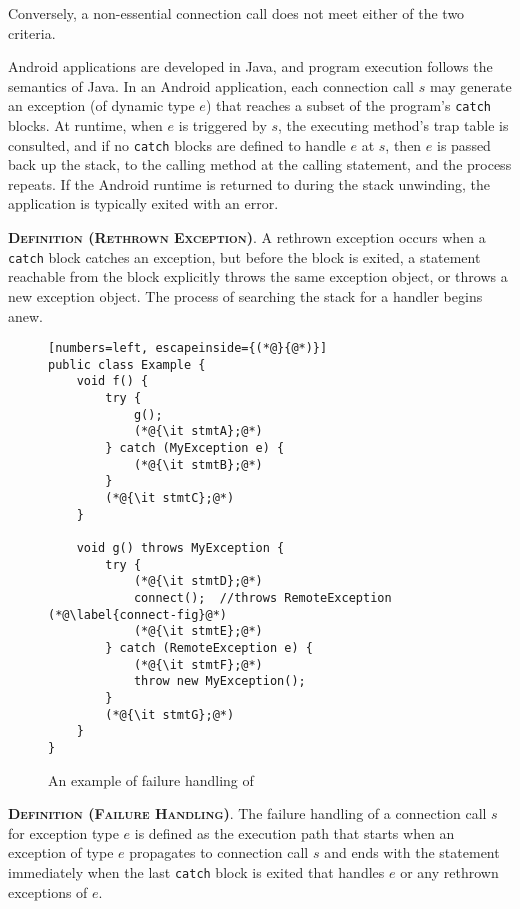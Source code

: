 \noindent Conversely, a non-essential connection call does not meet
either of the two criteria.  

Android applications are developed in Java, and program execution
follows the semantics of Java. In an Android application, each
connection call $s$ may generate an exception (of dynamic type $e$)
that reaches a subset of the program's \lstinline!catch! blocks.  At
runtime, when $e$ is triggered by $s$, the executing method's trap
table is consulted, and if no \lstinline!catch! blocks are defined to
handle $e$ at $s$, then $e$ is passed back up the stack, to the
calling method at the calling statement, and the process repeats.  If
the Android runtime is returned to during the stack unwinding, the
application is typically exited with an error.  

\noindent\textsc{\bfseries{Definition (Rethrown Exception)}}.  A
rethrown exception occurs when a \lstinline!catch! block catches an
exception, but before the block is exited, a statement reachable from
the block explicitly throws the same exception object, or throws a new
exception object.  The process of searching the stack for a handler
begins anew.

\begin{figure}
    \begin{lstlisting}[numbers=left, escapeinside={(*@}{@*)}]
public class Example {
    void f() {
        try {
            g();
            (*@{\it stmtA};@*)
        } catch (MyException e) {
            (*@{\it stmtB};@*)
        }
        (*@{\it stmtC};@*)
    }

    void g() throws MyException {
        try {
            (*@{\it stmtD};@*)
            connect();  //throws RemoteException (*@\label{connect-fig}@*)
            (*@{\it stmtE};@*)
        } catch (RemoteException e) {
            (*@{\it stmtF};@*)
            throw new MyException();            
        }        
        (*@{\it stmtG};@*)
    }
}
\end{lstlisting}
\caption{\label{fig:failure-handling}An example of failure handling of
}
\end{figure}

\noindent\textsc{\bfseries{Definition (Failure Handling)}}. The
failure handling of a connection call $s$ for exception type $e$ is
defined as the execution path that starts when an exception of type
$e$ propagates to connection call $s$ and ends with the statement
immediately when the last \lstinline!catch! block is exited that
handles $e$ or any rethrown exceptions of $e$.

